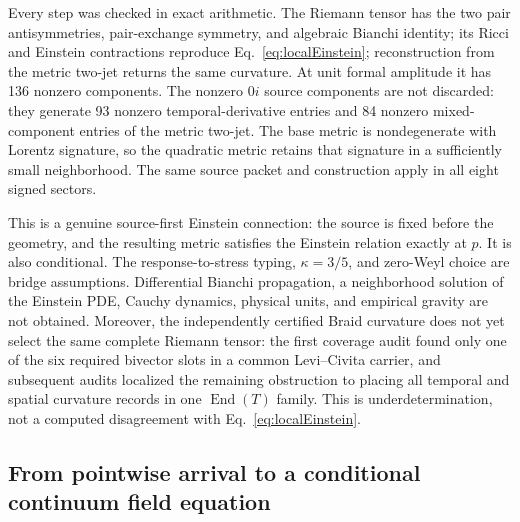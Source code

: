 \documentclass[11pt]{article}
\theoremstyle{definition}
\theoremstyle{remark}
\begin{document}
Every step was checked in exact arithmetic. The Riemann tensor has the two pair antisymmetries, pair-exchange symmetry, and algebraic Bianchi identity; its Ricci and Einstein contractions reproduce Eq.~\eqref{eq:localEinstein}; reconstruction from the metric two-jet returns the same curvature. At unit formal amplitude it has 136 nonzero components. The nonzero $0i$ source components are not discarded: they generate 93 nonzero temporal-derivative entries and 84 nonzero mixed-component entries of the metric two-jet. The base metric is nondegenerate with Lorentz signature, so the quadratic metric retains that signature in a sufficiently small neighborhood. The same source packet and construction apply in all eight signed sectors.

This is a genuine source-first Einstein connection: the source is fixed before the geometry, and the resulting metric satisfies the Einstein relation exactly at $p$. It is also conditional. The response-to-stress typing, $\kappa=3/5$, and zero-Weyl choice are bridge assumptions. Differential Bianchi propagation, a neighborhood solution of the Einstein PDE, Cauchy dynamics, physical units, and empirical gravity are not obtained. Moreover, the independently certified Braid curvature does not yet select the same complete Riemann tensor: the first coverage audit found only one of the six required bivector slots in a common Levi--Civita carrier, and subsequent audits localized the remaining obstruction to placing all temporal and spatial curvature records in one $\operatorname{End}(T)$ family. This is underdetermination, not a computed disagreement with Eq.~\eqref{eq:localEinstein}.

\subsection{From pointwise arrival to a conditional continuum field equation}
\end{document}

